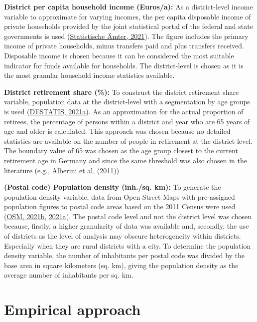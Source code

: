 \documentclass[12pt,twoside]{reedthesis}
\begin{document}
\textbf{District per capita household income (Euros/a):} As a district-level income variable to approximate for varying incomes, the per capita disposable income of private households provided by the joint statistical portal of the federal and state governments is used (\protect\hyperlink{ref-statistischeamter21}{Statistische Ämter, 2021}). The figure includes the primary income of private households, minus transfers paid and plus transfers received. Disposable income is chosen because it can be considered the most suitable indicator for funds available for households. The district-level is chosen as it is the most granular household income statistics available.

\textbf{District retirement share (\%):} To construct the district retirement share variable, population data at the district-level with a segmentation by age groups is used (\protect\hyperlink{ref-destatis21c}{DESTATIS, 2021a}). As an approximation for the actual proportion of retirees, the percentage of persons within a district and year who are 65 years of age and older is calculated. This approach was chosen because no detailed statistics are available on the number of people in retirement at the district-level. The boundary value of 65 was chosen as the age group closest to the current retirement age in Germany and since the same threshold was also chosen in the literature (e.g., \protect\hyperlink{ref-alberini_etal11}{Alberini et al.} (\protect\hyperlink{ref-alberini_etal11}{2011}))

\textbf{(Postal code) Population density (inh./sq. km):} To generate the population density variable, data from Open Street Maps with pre-assigned population figures to postal code areas based on the 2011 Census were used (\protect\hyperlink{ref-osm21}{OSM, 2021b}, \protect\hyperlink{ref-osm21a}{2021a}). The postal code level and not the district level was chosen because, firstly, a higher granularity of data was available and, secondly, the use of districts as the level of analysis may obscure heterogeneity within districts. Especially when they are rural districts with a city. To determine the population density variable, the number of inhabitants per postal code was divided by the base area in square kilometers (sq. km), giving the population density as the average number of inhabitants per sq. km.

\hypertarget{empirical-model}{%
\section{Empirical approach}\label{empirical-model}}
\end{document}
